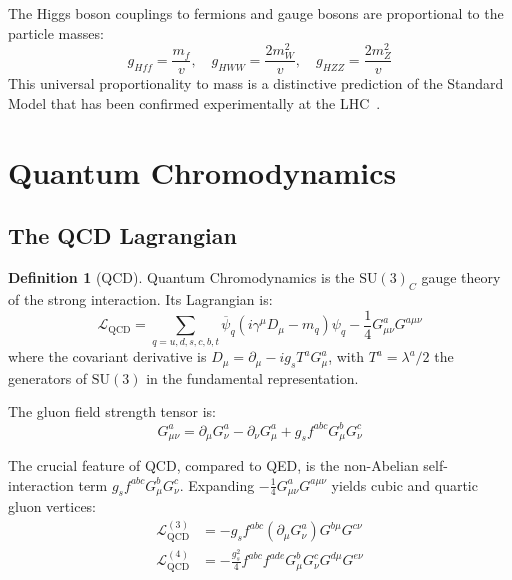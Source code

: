 \documentclass[12pt]{article}
\theoremstyle{definition}
\newtheorem{definition}[theorem]{Definition}
\theoremstyle{remark}
\newcommand{\Lagr}{\mathcal{L}}
\newcommand{\psibar}{\overline{\psi}}
\begin{document}
The Higgs boson couplings to fermions and gauge bosons are proportional to the particle masses:
\begin{equation}
g_{Hff} = \frac{m_f}{v}, \quad g_{HWW} = \frac{2m_W^2}{v}, \quad g_{HZZ} = \frac{2m_Z^2}{v}
\end{equation}
This universal proportionality to mass is a distinctive prediction of the Standard Model that has been confirmed experimentally at the LHC~\cite{ATLAS2022,CMS2022}.

\section{Quantum Chromodynamics}
\label{sec:qcd}

\subsection{The QCD Lagrangian}

\begin{definition}[QCD]
\label{def:qcd}
Quantum Chromodynamics is the $\mathrm{SU}(3)_C$ gauge theory of the strong interaction. Its Lagrangian is:
\begin{equation}
\label{eq:qcdlagrangian}
\Lagr_{\mathrm{QCD}} = \sum_{q=u,d,s,c,b,t} \psibar_q (i\gamma^\mu D_\mu - m_q)\psi_q - \frac{1}{4} G^a_{\mu\nu} G^{a\mu\nu}
\end{equation}
where the covariant derivative is $D_\mu = \partial_\mu - ig_s T^a G^a_\mu$, with $T^a = \lambda^a/2$ the generators of $\mathrm{SU}(3)$ in the fundamental representation.
\end{definition}

The gluon field strength tensor is:
\begin{equation}
G^a_{\mu\nu} = \partial_\mu G^a_\nu - \partial_\nu G^a_\mu + g_s f^{abc} G^b_\mu G^c_\nu
\end{equation}

The crucial feature of QCD, compared to QED, is the non-Abelian self-interaction term $g_s f^{abc} G^b_\mu G^c_\nu$. Expanding $-\frac{1}{4}G^a_{\mu\nu}G^{a\mu\nu}$ yields cubic and quartic gluon vertices:
\begin{align}
\Lagr_{\mathrm{QCD}}^{(3)} &= -g_s f^{abc} (\partial_\mu G^a_\nu) G^{b\mu} G^{c\nu} \\
\Lagr_{\mathrm{QCD}}^{(4)} &= -\frac{g_s^2}{4} f^{abc} f^{ade} G^b_\mu G^c_\nu G^{d\mu} G^{e\nu}
\end{align}
\end{document}
